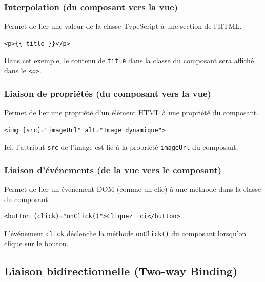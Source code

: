 \documentclass{article}
\begin{document}
\subsubsection{Interpolation (du composant vers la vue)}

Permet de lier une valeur de la classe TypeScript à une section de l'HTML.
\begin{verbatim}
<p>{{ title }}</p>
\end{verbatim}
Dans cet exemple, le contenu de \texttt{title} dans la classe du composant sera affiché dans le \texttt{<p>}.

\subsubsection{Liaison de propriétés (du composant vers la vue)}

Permet de lier une propriété d'un élément HTML à une propriété du composant.
\begin{verbatim}
<img [src]="imageUrl" alt="Image dynamique">
\end{verbatim}
Ici, l'attribut \texttt{src} de l'image est lié à la propriété \texttt{imageUrl} du composant.

\subsubsection{Liaison d'événements (de la vue vers le composant)}

Permet de lier un événement DOM (comme un clic) à une méthode dans la classe du composant.
\begin{verbatim}
<button (click)="onClick()">Cliquez ici</button>
\end{verbatim}
L'événement \texttt{click} déclenche la méthode \texttt{onClick()} du composant lorsqu'on clique sur le bouton.

\subsection{Liaison bidirectionnelle (Two-way Binding)}
\end{document}
